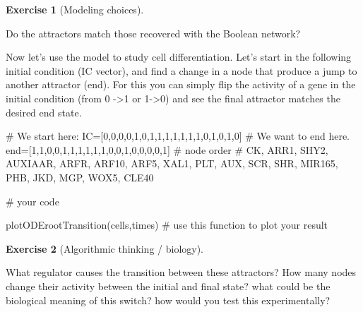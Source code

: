 \documentclass[
  letterpaper,
  DIV=11,
  numbers=noendperiod]{scrreprt}
\newenvironment{Shaded}{\begin{snugshade}}{\end{snugshade}}
\newcommand{\CommentTok}[1]{\textcolor[rgb]{0.37,0.37,0.37}{#1}}
\newcommand{\DecValTok}[1]{\textcolor[rgb]{0.68,0.00,0.00}{#1}}
\newcommand{\NormalTok}[1]{\textcolor[rgb]{0.00,0.23,0.31}{#1}}
\newcommand{\OperatorTok}[1]{\textcolor[rgb]{0.37,0.37,0.37}{#1}}
\theoremstyle{definition}
\newtheorem{exercise}{Exercise}[chapter]
\theoremstyle{remark}
\begin{document}
\begin{exercise}[Modeling
choices]\protect\hypertarget{exr-non}{}\label{exr-non}

Do the attractors match those recovered with the Boolean network?

\end{exercise}

Now let's use the model to study cell differentiation. Let's start in
the following initial condition (IC vector), and find a change in a node
that produce a jump to another attractor (end). For this you can simply
flip the activity of a gene in the initial condition (from 0
-\textgreater1 or 1-\textgreater0) and see the final attractor matches
the desired end state.

\begin{Shaded}
\begin{Highlighting}[]
\CommentTok{\# We start here: }
\NormalTok{IC}\OperatorTok{=}\NormalTok{[}\DecValTok{0}\NormalTok{,}\DecValTok{0}\NormalTok{,}\DecValTok{0}\NormalTok{,}\DecValTok{0}\NormalTok{,}\DecValTok{1}\NormalTok{,}\DecValTok{0}\NormalTok{,}\DecValTok{1}\NormalTok{,}\DecValTok{1}\NormalTok{,}\DecValTok{1}\NormalTok{,}\DecValTok{1}\NormalTok{,}\DecValTok{1}\NormalTok{,}\DecValTok{1}\NormalTok{,}\DecValTok{1}\NormalTok{,}\DecValTok{0}\NormalTok{,}\DecValTok{1}\NormalTok{,}\DecValTok{0}\NormalTok{,}\DecValTok{1}\NormalTok{,}\DecValTok{0}\NormalTok{]}
\CommentTok{\# We want to end here. }
\NormalTok{end}\OperatorTok{=}\NormalTok{[}\DecValTok{1}\NormalTok{,}\DecValTok{1}\NormalTok{,}\DecValTok{0}\NormalTok{,}\DecValTok{0}\NormalTok{,}\DecValTok{1}\NormalTok{,}\DecValTok{1}\NormalTok{,}\DecValTok{1}\NormalTok{,}\DecValTok{1}\NormalTok{,}\DecValTok{1}\NormalTok{,}\DecValTok{1}\NormalTok{,}\DecValTok{0}\NormalTok{,}\DecValTok{0}\NormalTok{,}\DecValTok{1}\NormalTok{,}\DecValTok{0}\NormalTok{,}\DecValTok{0}\NormalTok{,}\DecValTok{0}\NormalTok{,}\DecValTok{0}\NormalTok{,}\DecValTok{1}\NormalTok{]}
\CommentTok{\# node order}
\CommentTok{\# CK, ARR1, SHY2, AUXIAAR, ARFR, ARF10, ARF5, XAL1, PLT, AUX, SCR, SHR, MIR165, PHB, JKD, MGP, WOX5, CLE40}

\CommentTok{\# your code }

\NormalTok{plotODErootTransition(cells,times) }\CommentTok{\# use this function to plot your result}
\end{Highlighting}
\end{Shaded}

\begin{exercise}[Algorithmic thinking /
biology]\protect\hypertarget{exr-non}{}\label{exr-non}

What regulator causes the transition between these attractors? How many
nodes change their activity between the initial and final state? what
could be the biological meaning of this switch? how would you test this
experimentally?

\end{exercise}
\end{document}
